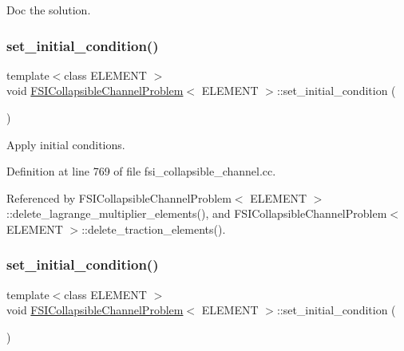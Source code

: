 Doc the solution. 

\mbox{\label{classFSICollapsibleChannelProblem_afdd6752cb134fd09ee8830158ed557b2}} 
\subsubsection{\texorpdfstring{set\+\_\+initial\+\_\+condition()}{set\_initial\_condition()}\hspace{0.1cm}{\footnotesize\ttfamily [1/4]}}
{\footnotesize\ttfamily template$<$class E\+L\+E\+M\+E\+NT $>$ \\
void \hyperlink{classFSICollapsibleChannelProblem}{F\+S\+I\+Collapsible\+Channel\+Problem}$<$ E\+L\+E\+M\+E\+NT $>$\+::set\+\_\+initial\+\_\+condition (\begin{DoxyParamCaption}{ }\end{DoxyParamCaption})}



Apply initial conditions. 



Definition at line 769 of file fsi\+\_\+collapsible\+\_\+channel.\+cc.



Referenced by F\+S\+I\+Collapsible\+Channel\+Problem$<$ E\+L\+E\+M\+E\+N\+T $>$\+::delete\+\_\+lagrange\+\_\+multiplier\+\_\+elements(), and F\+S\+I\+Collapsible\+Channel\+Problem$<$ E\+L\+E\+M\+E\+N\+T $>$\+::delete\+\_\+traction\+\_\+elements().

\mbox{\label{classFSICollapsibleChannelProblem_afdd6752cb134fd09ee8830158ed557b2}} 
\subsubsection{\texorpdfstring{set\+\_\+initial\+\_\+condition()}{set\_initial\_condition()}\hspace{0.1cm}{\footnotesize\ttfamily [2/4]}}
{\footnotesize\ttfamily template$<$class E\+L\+E\+M\+E\+NT $>$ \\
void \hyperlink{classFSICollapsibleChannelProblem}{F\+S\+I\+Collapsible\+Channel\+Problem}$<$ E\+L\+E\+M\+E\+NT $>$\+::set\+\_\+initial\+\_\+condition (\begin{DoxyParamCaption}{ }\end{DoxyParamCaption})}



